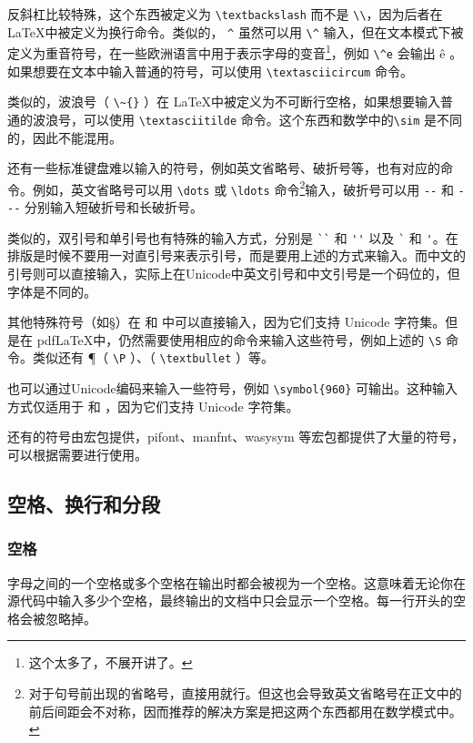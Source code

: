 反斜杠比较特殊，这个东西被定义为 \verb|\textbackslash| 而不是 \verb|\\|，因为后者在 \LaTeX 中被定义为换行命令。类似的， \verb|^| 虽然可以用 \verb|\^| 输入，但在文本模式下被定义为重音符号，在一些欧洲语言中用于表示字母的变音\footnote{这个太多了，不展开讲了。}，例如 \verb|\^e| 会输出 \^e 。如果想要在文本中输入普通的符号，可以使用 \verb|\textasciicircum| 命令。

类似的，波浪号（ \verb|\~{}| ）在 \LaTeX 中被定义为不可断行空格，如果想要输入普通的波浪号，可以使用 \verb|\textasciitilde| 命令。这个东西和数学中的\verb|\sim| 是不同的，因此不能混用。

还有一些标准键盘难以输入的符号，例如英文省略号、破折号等，也有对应的命令。例如，英文省略号可以用 \verb|\dots| 或 \verb|\ldots| 命令\footnote{对于句号前出现的省略号，直接用就行。但这也会导致英文省略号在正文中的前后间距会不对称，因而推荐的解决方案是把这两个东西都用在数学模式中。}输入，破折号可以用 \verb|--| 和 \verb|---| 分别输入短破折号和长破折号。

类似的，双引号和单引号也有特殊的输入方式，分别是 \verb|``| 和 \verb|''| 以及 \verb|`| 和 \verb|'|。在排版是时候不要用一对直引号来表示引号，而是要用上述的方式来输入。而中文的引号则可以直接输入，实际上在Unicode中英文引号和中文引号是一个码位的，但字体是不同的。

其他特殊符号（如\S{}）在 \XeLaTeX 和 \LuaLaTeX 中可以直接输入，因为它们支持 Unicode 字符集。但是在 pdf\LaTeX 中，仍然需要使用相应的命令来输入这些符号，例如上述的 \verb|\S| 命令。类似还有 \P{}（ \verb|\P| ）、\textbullet{}（ \verb|\textbullet| ）等。

也可以通过Unicode编码来输入一些符号，例如 \verb|\symbol{960}| 可输出。这种输入方式仅适用于 \XeLaTeX 和 \LuaLaTeX，因为它们支持 Unicode 字符集。

还有的符号由宏包提供，pifont、manfnt、wasysym 等宏包都提供了大量的符号，可以根据需要进行使用。

\subsection{空格、换行和分段}

\subsubsection{空格}

字母之间的一个空格或多个空格在输出时都会被视为一个空格。这意味着无论你在源代码中输入多少个空格，最终输出的文档中只会显示一个空格。每一行开头的空格会被忽略掉。


